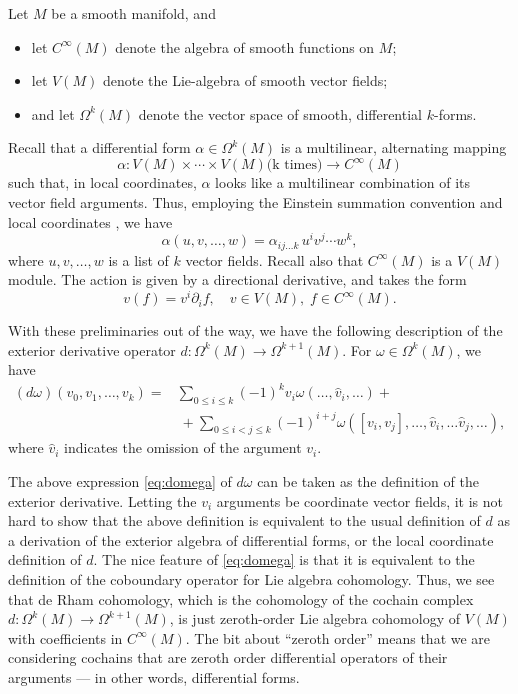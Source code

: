 \documentclass[12pt]{article}
\begin{document}
Let $M$ be a smooth manifold, and 
\begin{itemize}
\item  let $C^\infty(M)$ denote the algebra of smooth functions on $M$;
\item  let $V(M)$ denote the Lie-algebra of smooth  vector fields;
\item and let $\Omega^k(M)$ denote the vector space of smooth,
  differential $k$-forms.
\end{itemize}
Recall that a differential form $\alpha \in \Omega^k(M)$ is a
multilinear, alternating mapping \[\alpha:V(M)\times \cdots \times
V(M) \text{(k times)}\to C^\infty(M)\] such that, in local coordinates,
$\alpha$ looks like a multilinear combination of its vector field
arguments. Thus, employing the Einstein summation convention and local
coordinates , we have
\[ \alpha(u,v,\dots, w) = \alpha_{ij\dots k }\, u^i v^j \cdots w^k,\]
where $u,v,\dots, w $ is a list of $k$ vector fields.  Recall also
that $C^\infty(M)$ is a $V(M)$ module.  The action is given by
a directional derivative, and takes the form
\[ v(f) = v^i \partial_i f,\quad v\in V(M),\; f\in C^\infty(M).\]

With these preliminaries out of the way, we have the following
description of the exterior derivative operator $d:\Omega^k(M)\to
\Omega^{k+1}(M)$. For $\omega\in \Omega^k(M)$, we have
\begin{align}
\label{eq:domega}
(d \omega)(v_0,v_1,\dots, v_k) =& \sum_{0\leq i\leq k} (-1)^k v_i
\omega(\dots,\widehat{v}_i,\dots) + \\ \nonumber
&\ +\sum_{0\leq i<j\leq k}
(-1)^{i+j} \omega([v_i,v_j],\dots, \widehat{v}_i,\dots
\widehat{v}_j,\dots ),
\end{align}
where $\widehat{v}_i$ indicates the omission of the argument $v_i$.

The above expression \eqref{eq:domega} of $d\omega$ can be taken as
the definition of the exterior derivative. Letting the $v_i$ arguments be coordinate vector fields, it is not hard to show that the above definition is equivalent to the
usual definition of $d$ as a derivation of the exterior algebra of
differential forms, or the local coordinate definition of $d$. The
nice feature of \eqref{eq:domega} is that it is equivalent to the
definition of the coboundary operator for Lie algebra cohomology.
Thus, we see that de Rham cohomology, which is the cohomology of the
cochain complex $d:\Omega^k(M)\to \Omega^{k+1}(M)$, is just
zeroth-order Lie algebra cohomology of $V(M)$ with coefficients in
$C^\infty(M)$. The bit about ``zeroth order'' means that we are
considering cochains that are zeroth order differential operators of
their arguments --- in other words, differential forms.
\end{document}
